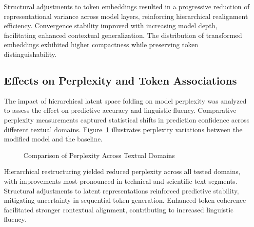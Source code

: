 \documentclass[5p,times]{elsarticle}
\begin{document}
Structural adjustments to token embeddings resulted in a progressive reduction of representational variance across model layers, reinforcing hierarchical realignment efficiency. Convergence stability improved with increasing model depth, facilitating enhanced contextual generalization. The distribution of transformed embeddings exhibited higher compactness while preserving token distinguishability.

\subsection{Effects on Perplexity and Token Associations}

The impact of hierarchical latent space folding on model perplexity was analyzed to assess the effect on predictive accuracy and linguistic fluency. Comparative perplexity measurements captured statistical shifts in prediction confidence across different textual domains. Figure~\ref{fig:perplexity_comparison} illustrates perplexity variations between the modified model and the baseline.

\begin{figure}[h]
	\centering
	\caption{Comparison of Perplexity Across Textual Domains}
	\label{fig:perplexity_comparison}
\end{figure}

Hierarchical restructuring yielded reduced perplexity across all tested domains, with improvements most pronounced in technical and scientific text segments. Structural adjustments to latent representations reinforced predictive stability, mitigating uncertainty in sequential token generation. Enhanced token coherence facilitated stronger contextual alignment, contributing to increased linguistic fluency.
\end{document}
